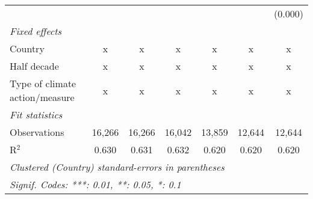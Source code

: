 \begin{tabular}{lcccccc}
                                                   &               &               &               &               &               & (0.000)\\   
   \emph{Fixed effects}\\
   Country                                         & x             & x             & x             & x             & x             & x\\  
   Half decade                                     & x             & x             & x             & x             & x             & x\\  
   Type of climate action/measure                  & x             & x             & x             & x             & x             & x\\  
   \midrule \emph{Fit statistics}\\
   Observations                                    & 16,266        & 16,266        & 16,042        & 13,859        & 12,644        & 12,644\\  
   R$^2$                                           & 0.630         & 0.631         & 0.632         & 0.620         & 0.620         & 0.620\\  
   \midrule
   \multicolumn{7}{l}{\emph{Clustered (Country) standard-errors in parentheses}}\\
   \multicolumn{7}{l}{\emph{Signif. Codes: ***: 0.01, **: 0.05, *: 0.1}}\\
\end{tabular}
\par\endgroup


